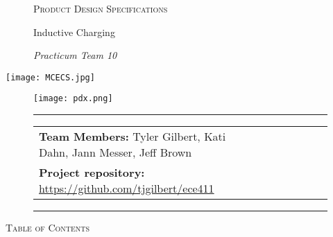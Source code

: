 \thispagestyle{empty}   %

\begin{figure}[t]
    \begin{center}
    {\huge \textsc{ Product Design Specifications}}
    \end{center}

    \begin{center}
    \LARGE Inductive Charging
    \end{center}

    \begin{center}
    \normalsize \textit{Practicum Team 10}
    \end{center}
\end{figure}

\vspace*{\fill}

\begingroup
    \begin{center}
    \texttt{[image: MCECS.jpg]}
    \end{center}
\endgroup
    
\vspace*{\fill}
    
\begin{figure}[b]
    \texttt{[image: pdx.png]}
\end{figure}


    \begin{figure}[!b]
    \begin{center}
    \rule{6in}{0.4pt}
    \begin{minipage}[t]{.75\textwidth}
    \begin{tabular}{llcccll}
    \textbf{Team Members:}  Tyler Gilbert, Kati Dahn, Jann Messer, Jeff Brown & & & &\\
    \textbf{Project repository:} \href{https://github.com/tjgilbert/ece411}{https://github.com/tjgilbert/ece411} \\
    \end{tabular}
    \end{minipage}
    \rule{6in}{0.4pt}
    \end{center}
    \end{figure}
    
\cleardoublepage
{}

\hypertarget{MyToc}{} %
\begin{center}
{\Large \textsc{ Table of Contents}}
\end{center}
\renewcommand{\contentsname}{}
\tableofcontents

\cleardoublepage